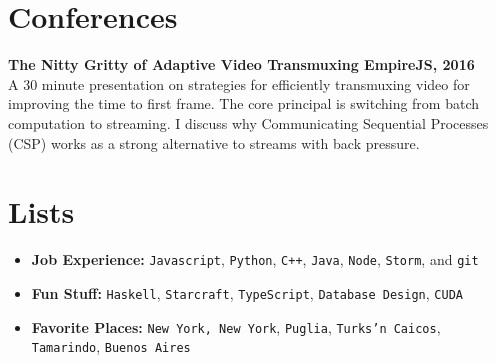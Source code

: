 \documentclass[oneside, final]{scrartcl}
\newcommand{\lang}[1]{\colorbox{light-gray}{\texttt{#1}}}
\begin{document}
\begin{center}
\begin{itemize}
\end{itemize}





\section{Conferences}
\begin{flushleft}
\textbf{The Nitty Gritty of Adaptive Video Transmuxing \hfill EmpireJS, 2016\\}
A 30 minute presentation on strategies for efficiently transmuxing video for improving the
time to first frame. The core principal is switching from batch computation to streaming.
I discuss why Communicating Sequential Processes (CSP) works as a strong alternative to streams with back pressure.
\end{flushleft}




\section{Lists}
\begin{itemize}
	\setlength{\itemsep}{1pt}
	\setlength{\parskip}{0pt}
	\setlength{\parsep}{0pt}
	\setlength{\leftmargin}{-5mm}
	\item \textbf{Job Experience:}  \lang{Javascript}, \lang{Python}, \lang{C++}, \lang{Java}, \lang{Node}, \lang{Storm}, and \lang{git} \\
	\item \textbf{Fun Stuff:}  \lang{Haskell}, \lang{Starcraft}, \lang{TypeScript}, \lang{Database Design}, \lang{CUDA} \\
	\item \textbf{Favorite Places:}
        \lang{New York, New York},
        \lang{Puglia},
        \lang{Turks'n Caicos},
        \lang{Tamarindo},
        \lang{Buenos Aires}
\end{itemize}


\end{center}
\end{document}
